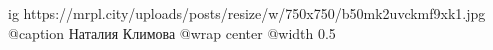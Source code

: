  
 
 
 
 

\ifcmt
  ig https://mrpl.city/uploads/posts/resize/w/750x750/b50mk2uvckmf9xk1.jpg
	@caption Наталия Климова
  @wrap center
  @width 0.5
\fi
